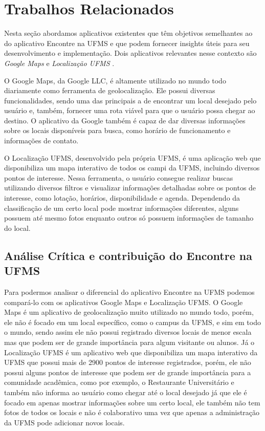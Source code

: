 \section{Trabalhos Relacionados}
\label{sec:trabalhos_relacionados}

Nesta seção abordamos aplicativos existentes que têm objetivos semelhantes ao do aplicativo Encontre na UFMS e que podem fornecer insights úteis para seu desenvolvimento e implementação. Dois aplicativos relevantes nesse contexto são \textit{Google Maps} \cite{maps2005} e \textit{Localização UFMS} \cite{localizacaoufms}.

O Google Maps, da Google LLC, é altamente utilizado no mundo todo diariamente como ferramenta de geolocalização. Ele possui diversas funcionalidades, sendo uma das principais a de encontrar um local desejado pelo usuário e, também, fornecer uma rota viável para que o usuário possa chegar ao destino. O aplicativo da Google também é capaz de dar diversas informações sobre os locais disponíveis para busca, como horário de funcionamento e informações de contato.

O Localização UFMS, desenvolvido pela própria UFMS, é uma aplicação web que disponibiliza um mapa interativo de todos os campi da UFMS, incluindo diversos pontos de interesse. Nessa ferramenta, o usuário consegue realizar buscas utilizando diversos filtros e visualizar informações detalhadas sobre os pontos de interesse, como lotação, horários, disponibilidade e agenda. Dependendo da classificação de um certo local pode mostrar informações diferentes, alguns possuem até mesmo fotos enquanto outros só possuem informações de tamanho do local.

\subsection{Análise Crítica e contribuição do Encontre na UFMS}
    Para podermos analisar o diferencial do aplicativo Encontre na UFMS podemos compará-lo com os aplicativos Google Maps e Localização UFMS. O Google Maps é um aplicativo de geolocalização muito utilizado no mundo todo, porém, ele não é focado em um local específico, como o campus da UFMS, e sim em todo o mundo, sendo assim ele não possui registrado diversos locais de menor escala mas que podem ser de grande importância para algum visitante ou alunos. Já o Localização UFMS é um aplicativo web que disponibiliza um mapa interativo da UFMS que possui mais de 2900 pontos de interesse registrados, porém, ele não possui alguns pontos de interesse que podem ser de grande importância para a comunidade acadêmica, como por exemplo, o Restaurante Universitário e também não informa ao usuário como chegar até o local desejado já que ele é focado em apenas mostrar informações sobre um certo local, ele também não tem fotos de todos os locais e não é colaborativo uma vez que apenas a administração da UFMS pode adicionar novos locais.

